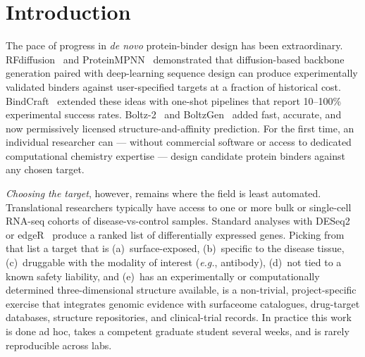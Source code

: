 \documentclass[11pt,letterpaper]{article}
\begin{document}
\begin{abstract}
a demonstration rather than a reproducibility path. A server-rendered web
interface runs the same discovery pipeline in a browser, launched locally
with \texttt{bindsight ui}; its evidence surface is additionally published
as static pages on the project documentation site at
\href{https://mikhaeelatefrizk.github.io/bindsight/}{mikhaeelatefrizk.github.io/bindsight}. On a real
TCGA breast-carcinoma cohort (tumor vs.\ adjacent normal, auto-downloaded from
NIH/GDC), the pipeline discovers antibody-tractable cell-surface antigens
over-expressed in tumor with full provenance; established targets such as ERBB2
(HER2) surface among the candidates when their expression signal is present.
Software is
licensed GNU AGPL-3.0-or-later and available at
\href{https://github.com/mikhaeelatefrizk/bindsight}{github.com/mikhaeelatefrizk/bindsight}.
\end{abstract}

\section{Introduction}

The pace of progress in \textit{de novo} protein-binder design has been
extraordinary. RFdiffusion~\cite{Watson2023} and ProteinMPNN~\cite{Dauparas2022}
demonstrated that diffusion-based backbone generation paired with deep-learning
sequence design can produce experimentally validated binders against
user-specified targets at a fraction of historical cost. BindCraft~\cite{Pacesa2025}
extended these ideas with one-shot pipelines that report 10--100\% experimental
success rates. Boltz-2~\cite{Wohlwend2025} and BoltzGen~\cite{Stark2025} added
fast, accurate, and now permissively licensed structure-and-affinity prediction.
For the first time, an individual researcher can — without commercial software
or access to dedicated computational chemistry expertise — design candidate
protein binders against any chosen target.

\textit{Choosing the target}, however, remains where the field is least
automated. Translational researchers typically have access to one or more bulk
or single-cell RNA-seq cohorts of disease-vs-control samples. Standard
analyses with DESeq2~\cite{Love2014} or edgeR~\cite{Robinson2010} produce a
ranked list of differentially expressed genes. Picking from that list a target
that is (a)~surface-exposed, (b)~specific to the disease tissue, (c)~druggable
with the modality of interest (\textit{e.g.}, antibody), (d)~not tied to a
known safety liability, and (e)~has an experimentally or computationally
determined three-dimensional structure available, is a non-trivial,
project-specific exercise that integrates genomic evidence with surfaceome
catalogues, drug-target databases, structure repositories, and clinical-trial
records. In practice this work is done ad hoc, takes a competent graduate
student several weeks, and is rarely reproducible across labs.
\end{document}
